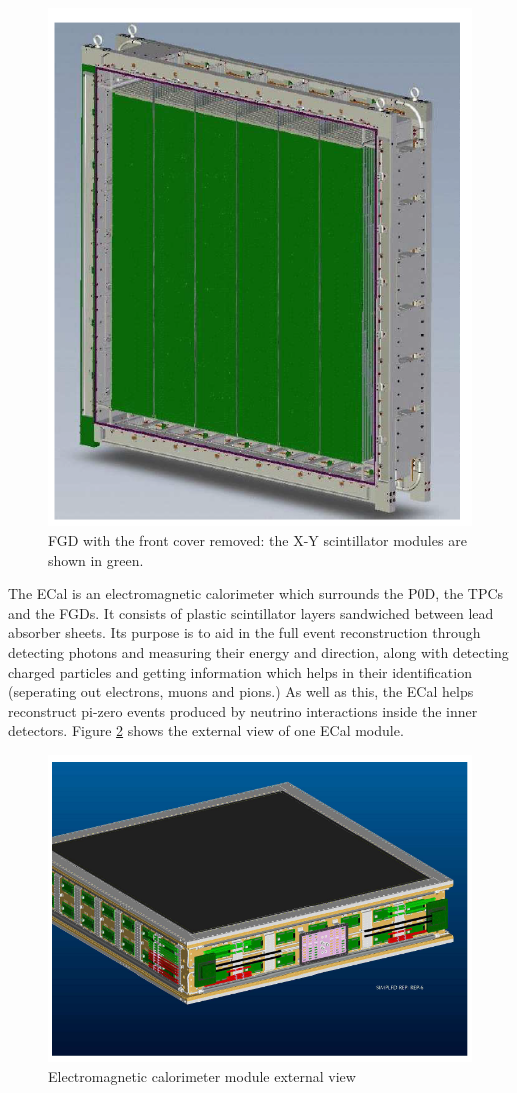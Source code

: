 \begin{figure}
    \includegraphics[width=\textwidth]{Figures/FGD_schematic.png}
    \caption{FGD with the front cover removed: the X-Y scintillator modules are shown in green.}
\label{fig:FGD_schematic}
\end{figure}

The ECal is an electromagnetic calorimeter which surrounds the P0D, the TPCs and the FGDs. It consists of plastic scintillator layers sandwiched between lead absorber sheets. Its purpose is to aid in the full event reconstruction through detecting photons and measuring their energy and direction, along with detecting charged particles and getting information which helps in their identification (seperating out electrons, muons and pions.) As well as this, the ECal helps reconstruct pi-zero events produced by neutrino interactions inside the inner detectors. Figure \ref{fig:ECal_schematic} shows the external view of one ECal module.

\begin{figure}
    \includegraphics[width=\textwidth]{Figures/ECal_schematic.png}
    \caption{Electromagnetic calorimeter module external view}
\label{fig:ECal_schematic}
\end{figure}

